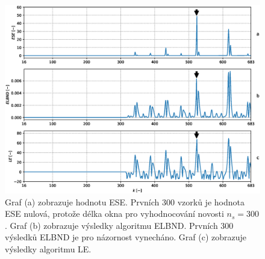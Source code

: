 \begin{figure}[!ht]
    \centering
    \includegraphics[scale=0.57]{IMG/mdpi/mackey_results_nd.eps}
    \caption{Graf (a) zobrazuje hodnotu ESE. Prvních 300 vzorků je hodnota ESE nulová, protože délka okna pro vyhodnocování novosti $n_s=300$. Graf (b) zobrazuje výsledky algoritmu ELBND. Prvních 300 výsledků ELBND je pro názornost vynecháno. Graf (c) zobrazuje výsledky algoritmu LE.}
    \label{fig:mackey_results_nd}
\end{figure}

